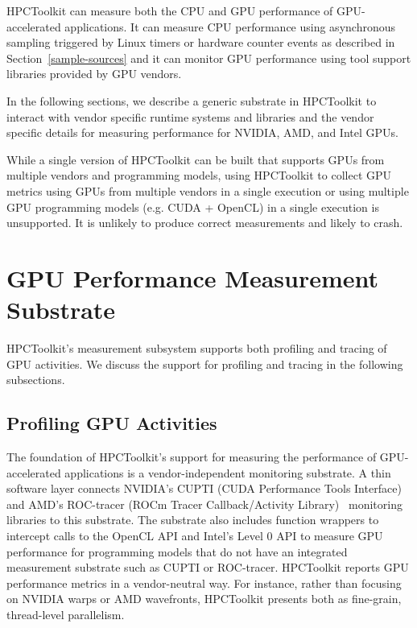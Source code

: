 HPCToolkit can measure both the CPU and GPU performance of GPU-accelerated applications. It can measure CPU performance using asynchronous sampling triggered by Linux timers or hardware counter events as described in
Section~\ref{sample-sources} and it can monitor GPU performance using tool support libraries provided by GPU vendors.

In the following sections, we describe a generic substrate in HPCToolkit to interact with vendor specific runtime systems and libraries and the vendor specific details for measuring performance for NVIDIA, AMD, and Intel GPUs.

While a single version of HPCToolkit can be built that supports GPUs from multiple vendors and programming models, using HPCToolkit to collect GPU metrics  using GPUs from multiple vendors in a single execution or using multiple GPU programming models (e.g. CUDA + OpenCL) in a single execution is unsupported. It is  unlikely to produce correct measurements and likely to crash.

\section{GPU Performance Measurement Substrate}

HPCToolkit's measurement subsystem supports both profiling and tracing of GPU activities. We discuss the support for profiling and tracing in the following subsections.

\subsection{Profiling GPU Activities}

The foundation of HPCToolkit's support for measuring the performance of GPU-accelerated applications is a vendor-independent monitoring substrate. A thin software layer connects NVIDIA's CUPTI (CUDA Performance Tools Interface)~\cite{cupti} and AMD's ROC-tracer (ROCm Tracer Callback/Activity Library)~\cite{roctracer} monitoring libraries to this substrate. The substrate also includes function wrappers to intercept calls to the OpenCL API and Intel's Level 0 API to measure GPU performance for programming models that do not have an integrated measurement substrate
such as CUPTI or ROC-tracer.
HPCToolkit reports GPU performance metrics in a vendor-neutral way. For instance, rather than focusing on NVIDIA warps or AMD wavefronts, HPCToolkit presents both as fine-grain, thread-level parallelism.

